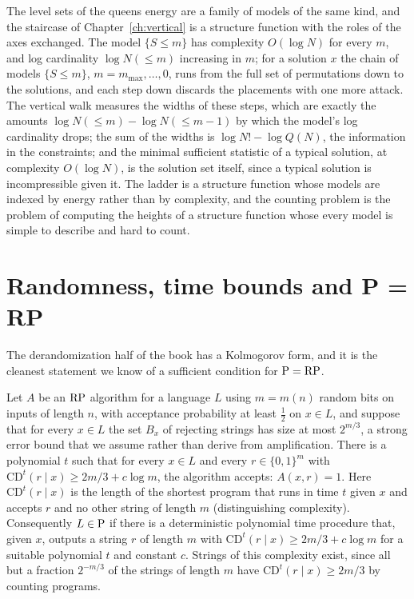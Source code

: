 The level sets of the queens energy are a family of models of the same kind, and the staircase of Chapter~\ref{ch:vertical} is a structure function with the roles of the axes exchanged. The model $\{ S \le m \}$ has complexity $O(\log N)$ for every $m$, and log cardinality $\log N(\le m)$ increasing in $m$; for a solution $x$ the chain of models $\{ S \le m \}$, $m = m_{\max}, \dots, 0$, runs from the full set of permutations down to the solutions, and each step down discards the placements with one more attack. The vertical walk measures the widths of these steps, which are exactly the amounts $\log N(\le m) - \log N(\le m - 1)$ by which the model's log cardinality drops; the sum of the widths is $\log N! - \log Q(N)$, the information in the constraints; and the minimal sufficient statistic of a typical solution, at complexity $O(\log N)$, is the solution set itself, since a typical solution is incompressible given it. The ladder is a structure function whose models are indexed by energy rather than by complexity, and the counting problem is the problem of computing the heights of a structure function whose every model is simple to describe and hard to count.

\section{Randomness, time bounds and P = RP}

The derandomization half of the book has a Kolmogorov form, and it is the cleanest statement we know of a sufficient condition for $\mathrm{P} = \mathrm{RP}$.

\begin{proposition}
\label{prop:random}
Let $A$ be an $\mathrm{RP}$ algorithm for a language $L$ using $m = m(n)$ random bits on inputs of length $n$, with acceptance probability at least $\tfrac12$ on $x \in L$, and suppose that for every $x \in L$ the set $B_x$ of rejecting strings has size at most $2^{m/3}$, a strong error bound that we assume rather than derive from amplification. There is a polynomial $t$ such that for every $x \in L$ and every $r \in \{0,1\}^m$ with $\mathrm{CD}^t(r \mid x) \ge 2m/3 + c \log m$, the algorithm accepts: $A(x, r) = 1$. Here $\mathrm{CD}^t(r \mid x)$ is the length of the shortest program that runs in time $t$ given $x$ and accepts $r$ and no other string of length $m$ (distinguishing complexity). Consequently $L \in \mathrm{P}$ if there is a deterministic polynomial time procedure that, given $x$, outputs a string $r$ of length $m$ with $\mathrm{CD}^t(r \mid x) \ge 2m/3 + c \log m$ for a suitable polynomial $t$ and constant $c$. Strings of this complexity exist, since all but a fraction $2^{-m/3}$ of the strings of length $m$ have $\mathrm{CD}^t(r \mid x) \ge 2m/3$ by counting programs.
\end{proposition}

